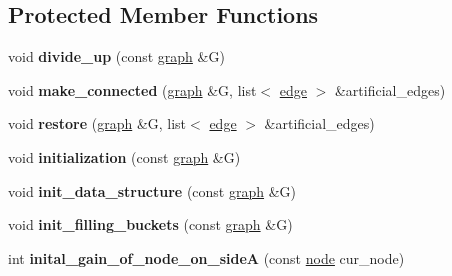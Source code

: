 \subsection*{Protected Member Functions}
\begin{DoxyCompactItemize}
\item 
\mbox{\label{classratio__cut__partition_a04bea9656188ed01612106d797d1fd47}} 
void {\bfseries divide\+\_\+up} (const \mbox{\hyperlink{classgraph}{graph}} \&G)
\item 
\mbox{\label{classratio__cut__partition_a20a50609115998baaa361627a5a1ca79}} 
void {\bfseries make\+\_\+connected} (\mbox{\hyperlink{classgraph}{graph}} \&G, list$<$ \mbox{\hyperlink{classedge}{edge}} $>$ \&artificial\+\_\+edges)
\item 
\mbox{\label{classratio__cut__partition_afe0ee5301d84ba30787cffaf66583537}} 
void {\bfseries restore} (\mbox{\hyperlink{classgraph}{graph}} \&G, list$<$ \mbox{\hyperlink{classedge}{edge}} $>$ \&artificial\+\_\+edges)
\item 
\mbox{\label{classratio__cut__partition_af4723810ece28284c79001b9ccf42ca4}} 
void {\bfseries initialization} (const \mbox{\hyperlink{classgraph}{graph}} \&G)
\item 
\mbox{\label{classratio__cut__partition_a53b8ad2845ed39cc2677721c747bdce6}} 
void {\bfseries init\+\_\+data\+\_\+structure} (const \mbox{\hyperlink{classgraph}{graph}} \&G)
\item 
\mbox{\label{classratio__cut__partition_a19fc538dbdaf8b1e0810a5bcde348c38}} 
void {\bfseries init\+\_\+filling\+\_\+buckets} (const \mbox{\hyperlink{classgraph}{graph}} \&G)
\item 
\mbox{\label{classratio__cut__partition_a0f2caf60f5a9be58c983c84655537d51}} 
int {\bfseries inital\+\_\+gain\+\_\+of\+\_\+node\+\_\+on\+\_\+sideA} (const \mbox{\hyperlink{classnode}{node}} cur\+\_\+node)
\item 
\mbox{\label{classratio__cut__partition_ab1c602d2c984844f9fe51c4a889327c4}} 

\end{DoxyCompactItemize}
